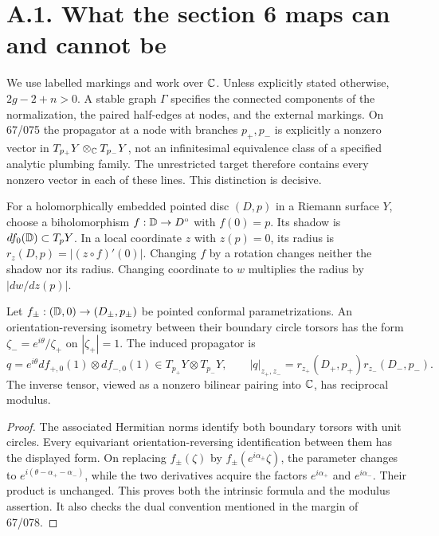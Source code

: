 \section{A.1. What the section 6 maps can and cannot be}

We use labelled markings and work over ${\mathbb{C}}$. Unless explicitly stated otherwise,
$2g-2+n>0$. A stable graph $\Gamma$ specifies the connected components of the
normalization, the paired half-edges at nodes, and the external markings. On
67/075 the propagator at a node with branches $p_+,p_-$ is explicitly a nonzero
vector in $T_{p_+}Y\otimes_{\mathbb{C}} T_{p_-}Y$, not an infinitesimal equivalence class
of a specified analytic plumbing family. The unrestricted target therefore
contains every nonzero vector in each of these lines. This distinction is
decisive.

\begin{definition}\label{A:shadowdef}
For a holomorphically embedded pointed disc $(D,p)$ in a Riemann surface $Y$,
choose a biholomorphism $f:{\mathbb{D}}\to D^\circ$ with $f(0)=p$. Its shadow is
$df_0({\mathbb{D}})\subset T_pY$. In a local coordinate $z$ with $z(p)=0$, its radius
is $r_z(D,p)=|(z\circ f)'(0)|$. Changing $f$ by a rotation changes neither
the shadow nor its radius. Changing coordinate to $w$ multiplies the radius
by $|dw/dz(p)|$.
\end{definition}

\begin{lemma}\label{A:tensor}
Let $f_\pm:({\mathbb{D}},0)\to(D_\pm,p_\pm)$ be pointed conformal parametrizations.
An orientation-reversing isometry between their boundary circle torsors has
the form $\zeta_- = e^{i\theta}/\zeta_+$ on $|\zeta_+|=1$. The induced
propagator is
\[
 q=e^{i\theta}df_{+,0}(1)\otimes df_{-,0}(1)
       \in T_{p_+}Y\otimes T_{p_-}Y,
 \qquad |q|_{z_+,z_-}=r_{z_+}(D_+,p_+)r_{z_-}(D_-,p_-).
\]
The inverse tensor, viewed as a nonzero bilinear pairing into ${\mathbb{C}}$, has
reciprocal modulus.
\end{lemma}
\begin{proof}
The associated Hermitian norms identify both boundary torsors with unit
circles. Every equivariant orientation-reversing identification between them
has the displayed form. On replacing $f_\pm(\zeta)$ by
$f_\pm(e^{i\alpha_\pm}\zeta)$, the parameter changes to
$e^{i(\theta-\alpha_+-\alpha_-)}$, while the two derivatives acquire the
factors $e^{i\alpha_+}$ and $e^{i\alpha_-}$. Their product is unchanged.
This proves both the intrinsic formula and the modulus assertion. It also
checks the dual convention mentioned in the margin of 67/078.
\end{proof}

